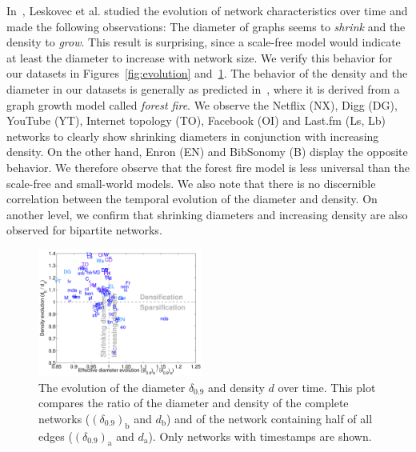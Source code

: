 \documentclass[11pt,a4paper]{book}
\newcommand{\wTwo}{0.48}
\begin{document}
In~\cite{b242}, Leskovec et al. studied the evolution of network
characteristics over time and made the following observations: The
diameter of graphs seems to \emph{shrink} and the density to
\emph{grow}.  This result is surprising, since a scale-free model would
indicate at least the diameter to increase with network size.  We verify
this behavior for our datasets in Figures~\ref{fig:evolution}
and~\ref{fig:scatter.diadens}.  The behavior of the density and the
diameter in our datasets is generally as predicted in~\cite{b242}, where
it is derived from a graph growth model called \emph{forest fire}.  We
observe the Netflix (\textsf{NX}), Digg (\textsf{DG}), YouTube
(\textsf{YT}), Internet topology (\textsf{TO}), Facebook (\textsf{OI})
and Last.fm (\textsf{Ls}, \textsf{Lb}) networks to clearly show
shrinking diameters in conjunction with increasing density.  On the
other hand, Enron (\textsf{EN}) and BibSonomy (\textsf{B}) display the
opposite behavior.  We therefore observe that the forest fire model is
less universal than the scale-free and small-world models.  We also note
that there is no discernible correlation between the temporal evolution
of the diameter and density.  On another level, we confirm that
shrinking diameters and increasing density are also observed for
bipartite networks.

\begin{figure}[h!]
  \centering
  \includegraphics[width=\wTwo\textwidth]{img-st/scatter.diadens.a}
  \caption{
    The evolution of the diameter $\delta_{0.9}$ and density $d$ over time.
    This plot compares the ratio of the diameter and
    density of the complete networks ($(\delta_{0.9})_{\mathrm b}$ and
    $d_{\mathrm b}$) and of the network 
    containing half of all edges ($(\delta_{0.9})_{\mathrm a}$ and $d_{\mathrm
      a}$).  Only networks with 
    timestamps are shown.  
  }
  \label{fig:scatter.diadens}
\end{figure}
\end{document}
